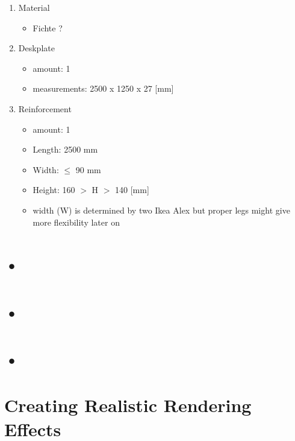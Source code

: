 \documentclass[a4paper,12pt]{book}
\begin{document}
\begin{enumerate}[label=\Roman*, font=\bfseries]
	
	\item Material	
	\begin{itemize}
		\item Fichte ?
	\end{itemize}		
	
	\item Deskplate
	\begin{itemize}
		\item amount: 1
		\item measurements: 2500 x 1250 x 27 [mm]
	\end{itemize}

	\item Reinforcement
	\begin{itemize}
		\item amount: 1
		\item Length: 2500 mm
		\item Width: $\leq$ 90 mm
		\item Height: 160 $>$ H $>$ 140 [mm]
		\item width (W) is determined by two Ikea Alex but proper legs might give more flexibility later on	
	\end{itemize}
\end{enumerate}

\chapter{}
\chapter{•}
\chapter{•}
\chapter{•}
\chapter{Creating Realistic Rendering Effects}
\end{document}

